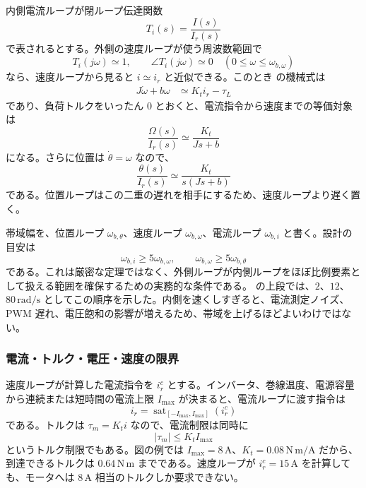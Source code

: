 内側電流ループが閉ループ伝達関数
\begin{equation}
  T_i(s)=\frac{I(s)}{I_r(s)}
\end{equation}
で表されるとする。外側の速度ループが使う周波数範囲で
\begin{equation}
  T_i(j\omega)\simeq 1,
  \qquad
  \angle T_i(j\omega)\simeq 0
  \quad (0\leq\omega\leq\omega_{b,\omega})
  \label{eq:current-loop-fast-condition}
\end{equation}
なら、速度ループから見ると $i\simeq i_r$ と近似できる。このとき  の機械式は
\begin{align}
  J\dot{\omega}+b\omega
  &\simeq K_t i_r-\tau_L
\end{align}
であり、負荷トルクをいったん 0 とおくと、電流指令から速度までの等価対象は
\begin{equation}
  \frac{\Omega(s)}{I_r(s)}
  \simeq
  \frac{K_t}{Js+b}
  \label{eq:current-to-speed-equivalent}
\end{equation}
になる。さらに位置は $\dot{\theta}=\omega$ なので、
\begin{equation}
  \frac{\theta(s)}{I_r(s)}
  \simeq
  \frac{K_t}{s(Js+b)}
  \label{eq:current-to-position-equivalent}
\end{equation}
である。位置ループはこの二重の遅れを相手にするため、速度ループより遅く置く。

帯域幅を、位置ループ $\omega_{b,\theta}$、速度ループ $\omega_{b,\omega}$、電流ループ $\omega_{b,i}$ と書く。設計の目安は
\begin{equation}
  \omega_{b,i}\geq 5\omega_{b,\omega},
  \qquad
  \omega_{b,\omega}\geq 5\omega_{b,\theta}
  \label{eq:cascade-bandwidth-order}
\end{equation}
である。これは厳密な定理ではなく、外側ループが内側ループをほぼ比例要素として扱える範囲を確保するための実務的な条件である。 の上段では、$2$、$12$、$80\,\mathrm{rad/s}$ としてこの順序を示した。内側を速くしすぎると、電流測定ノイズ、PWM 遅れ、電圧飽和の影響が増えるため、帯域を上げるほどよいわけではない。

\subsubsection{電流・トルク・電圧・速度の限界}

速度ループが計算した電流指令を $i_r^c$ とする。インバータ、巻線温度、電源容量から連続または短時間の電流上限 $I_{\max}$ が決まると、電流ループに渡す指令は
\begin{equation}
  i_r=\operatorname{sat}_{[-I_{\max},I_{\max}]}(i_r^c)
  \label{eq:current-command-limit}
\end{equation}
である。トルクは $\tau_m=K_t i$ なので、電流制限は同時に
\begin{equation}
  |\tau_m|\leq K_t I_{\max}
  \label{eq:torque-current-limit}
\end{equation}
というトルク制限でもある。図の例では $I_{\max}=8\,\mathrm{A}$、$K_t=0.08\,\mathrm{N\,m/A}$ だから、到達できるトルクは $0.64\,\mathrm{N\,m}$ までである。速度ループが $i_r^c=15\,\mathrm{A}$ を計算しても、モータへは $8\,\mathrm{A}$ 相当のトルクしか要求できない。

